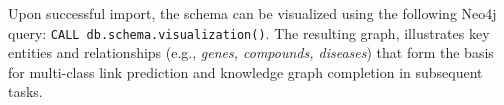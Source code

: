 Upon successful import, the schema can be visualized using the following Neo4j query: \texttt{CALL db.schema.visualization()}. The resulting graph, illustrates key entities and relationships (e.g., \textit{genes, compounds, diseases}) that form the basis for multi-class link prediction and knowledge graph completion in subsequent tasks.
